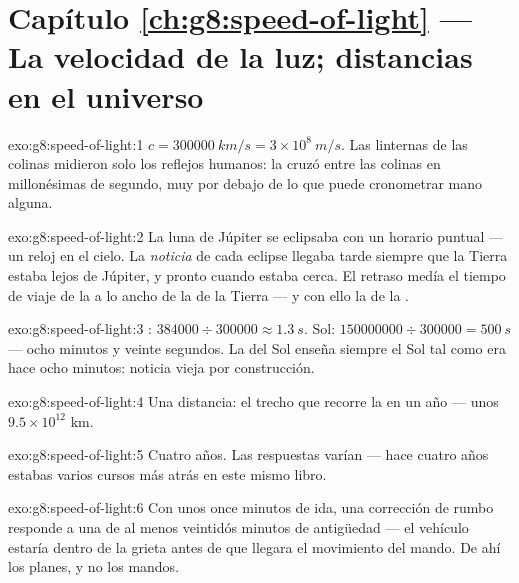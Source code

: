 \section*{Capítulo \ref{ch:g8:speed-of-light} --- La velocidad de la luz; distancias en el universo}

\begin{solution}{exo:g8:speed-of-light:1}
$c = \qty{300000}{km/s} = 3 \times 10^{8}\ \unit{m/s}$. Las linternas
de las colinas midieron solo los reflejos humanos: la  cruzó
entre las colinas en millonésimas de segundo, muy por debajo de lo que
puede cronometrar mano alguna.
\end{solution}

\begin{solution}{exo:g8:speed-of-light:2}
La luna de Júpiter se eclipsaba con un horario puntual --- un reloj en
el cielo. La \emph{noticia} de cada eclipse llegaba tarde siempre que
la Tierra estaba lejos de Júpiter, y pronto cuando estaba cerca. El
retraso medía el tiempo de viaje de la  a lo ancho de la
 de la Tierra --- y con ello la  de la
.
\end{solution}

\begin{solution}{exo:g8:speed-of-light:3}
: $384000 \div 300000 \approx \qty{1.3}{s}$. Sol: $150000000
\div 300000 = \qty{500}{s}$ --- ocho minutos y veinte segundos. La 
del Sol enseña siempre el Sol tal como era hace ocho minutos: noticia
vieja por construcción.
\end{solution}

\begin{solution}{exo:g8:speed-of-light:4}
Una distancia: el trecho que recorre la  en un año --- unos
$9.5 \times 10^{12}$ km.
\end{solution}

\begin{solution}{exo:g8:speed-of-light:5}
Cuatro años. Las respuestas varían --- hace cuatro años estabas varios
cursos más atrás en este mismo libro.
\end{solution}

\begin{solution}{exo:g8:speed-of-light:6}
Con unos once minutos de ida, una corrección de rumbo responde a una
 de al menos veintidós minutos de antigüedad --- el vehículo
estaría dentro de la grieta antes de que llegara el movimiento del
mando. De ahí los planes, y no los mandos.
\end{solution}

